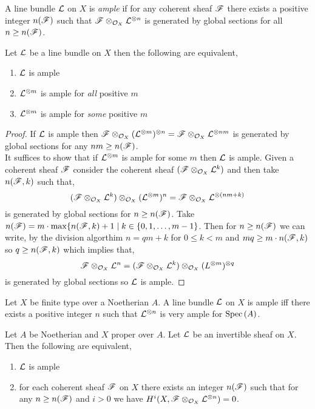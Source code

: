 \documentclass[12pt]{article}
\begin{document}
\begin{definition}
A line bundle $\mathcal{L}$ on $X$ is \textit{ample} if for any coherent sheaf $\mathscr{F}$ there exists a positive integer $n(\mathscr{F})$ such that $\mathscr{F} \otimes_{\mathcal{O}_{X}} \mathcal{L}^{\otimes n}$ is generated by global sections for all $n \ge n(\mathscr{F})$.
\end{definition}

\begin{proposition}
Let $\mathcal{L}$ be a line bundle on $X$ then the following are equivalent,
\begin{enumerate}
\item $\mathcal{L}$ is ample
\item $\mathcal{L}^{\otimes m}$ is ample for \textit{all} positive $m$
\item $\mathcal{L}^{\otimes m}$ is ample for \textit{some} positive $m$
\end{enumerate}
\end{proposition}

\begin{proof}
If $\mathcal{L}$ is ample then $\mathscr{F} \otimes_{\mathcal{O}_{X}} (\mathcal{L}^{\otimes m})^{\otimes n} = \mathscr{F} \otimes_{\mathcal{O}_{X}} \mathcal{L}^{\otimes n m}$ is generated by global sections for any $nm \ge n(\mathscr{F})$. 
\bigskip\\
It suffices to show that if $\mathcal{L}^{\otimes m}$ is ample for some $m$ then $\mathcal{L}$ is ample. Given a coherent sheaf $\mathscr{F}$ consider the coherent sheaf $(\mathscr{F} \otimes_{\mathcal{O}_{X}} \mathcal{L}^k)$ and then take $n(\mathscr{F}, k)$ such that,
\[ (\mathscr{F} \otimes_{\mathcal{O}_{X}} \mathcal{L}^k) \otimes_{\mathcal{O}_{X}} (\mathcal{L}^{\otimes m})^n = \mathscr{F} \otimes_{\mathcal{O}_{X}} \mathcal{L}^{\otimes (nm + k)} \]
is generated by global sections for $n \ge n(\mathscr{F})$. Take $n(\mathscr{F}) = m \cdot \max\{ n(\mathscr{F}, k) + 1 \mid k \in \{ 0, 1, \dots, m - 1 \}$. Then for $n \ge n(\mathscr{F})$ we can write, by the division algorthim $n = q m + k$ for $0 \le k < m$ and $m q \ge m \cdot n(\mathscr{F}, k)$ so $q \ge n(\mathscr{F}, k)$ which implies that,
\[ \mathscr{F} \otimes_{\mathcal{O}_{X}} \mathcal{L}^n = (\mathscr{F} \otimes_{\mathcal{O}_{X}} \mathcal{L}^k) \otimes_{\mathcal{O}_{X}} (L^{\otimes m})^{\otimes q} \]
is generated by global sections so $\mathcal{L}$ is ample. 
\end{proof}

\begin{theorem}
Let $X$ be finite type over a Noetherian $A$. A line bundle $\mathcal{L}$ on $X$ is ample iff there exists a positive integer $n$ such that $\mathcal{L}^{\otimes n}$ is very ample for $\mathrm{Spec}\left( A \right)$. 
\end{theorem}

\begin{theorem}[Serre]
Let $A$ be Noetherian and $X$ proper over $A$. Let $\mathcal{L}$ be an invertible sheaf on $X$. Then the following are equivalent,
\begin{enumerate}
\item $\mathcal{L}$ is ample
\item for each coherent sheaf $\mathscr{F}$ on $X$ there exists an integer $n(\mathscr{F})$ such that for any $n \ge n(\mathscr{F})$ and $i > 0$ we have $H^i(X, \mathscr{F} \otimes_{\mathcal{O}_{X}} \mathcal{L}^{\otimes n}) = 0$.
\end{enumerate}
\end{theorem}
\end{document}

